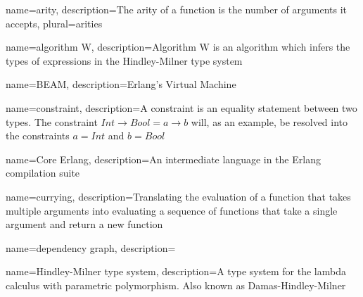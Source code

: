 
%


%




{ name={arity},
  description={The arity of a function is the number of arguments it accepts},
  plural={arities}
}

{ name={algorithm W},
  description={Algorithm W is an algorithm which infers the types of expressions in the Hindley-Milner type system}
}

{ name={BEAM},
  description={Erlang's Virtual Machine}
}


{ name={constraint},
  description={A constraint is an equality statement between two types. The constraint $Int \to Bool = a \to b$ will, as an example, be resolved into the constraints $a = Int$ and $b = Bool$}
}

{ name={Core Erlang},
  description={An intermediate language in the Erlang compilation suite}
}

{ name={currying},
  description={Translating the evaluation of a function that takes multiple arguments into evaluating a sequence of functions that take a single argument and return a new function}
}

{ name={dependency graph},
  description={}
}

{ name={Hindley-Milner type system},
  description={A type system for the lambda calculus with parametric polymorphism. Also known as Damas-Hindley-Milner}
}

